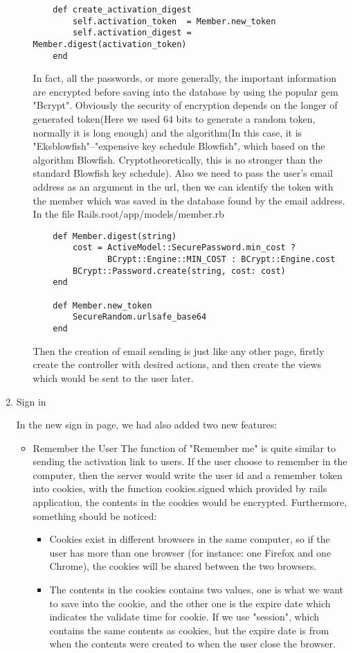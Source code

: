 \begin{enumerate}
\begin{itemize}
\begin{lstlisting}
	def create_activation_digest
		self.activation_token  = Member.new_token
		self.activation_digest = Member.digest(activation_token)
	end
\end{lstlisting}
In fact, all the passwords, or more generally, the important information are encrypted before saving into the database by using the popular gem "Bcrypt". Obviously the security of encryption depends on the longer of generated token(Here we used 64 bits to generate a random token, normally it is long enough) and the algorithm(In this case, it is "Eksblowfish"--"expensive key schedule Blowfish", which based on the algorithm Blowfish. Cryptotheoretically, this is no stronger than the standard Blowfish key schedule). Also we need to pass the user's email address as an argument in the url, then we can identify the token with the member which was saved in the database found by the email address.
In the file Rails.root/app/models/member.rb
\begin{lstlisting}
    def Member.digest(string)
   		cost = ActiveModel::SecurePassword.min_cost ? 
   			   BCrypt::Engine::MIN_COST : BCrypt::Engine.cost
		BCrypt::Password.create(string, cost: cost)
    end
    
    def Member.new_token
   	 	SecureRandom.urlsafe_base64
   	end
\end{lstlisting}
Then the creation of email sending is just like any other page, firstly create the controller with desired actions, and then create the views which would be sent to the user later.
\end{itemize}

\item{Sign in}

In the new sign in page, we had also added two new features:
\begin{itemize}
\item{Remember the User}
The function of "Remember me" is quite similar to sending the activation link to users. If the user choose to remember in the computer, then the server would write the user id and a remember token into cookies, with the function cookies.signed which provided by rails application, the contents in the cookies would be encrypted. Furthermore, something should be noticed: 
\begin{itemize}
\item Cookies exist in different browsers in the same computer, so if the user has more than one browser (for instance: one Firefox and one Chrome), the cookies will be shared between the two browsers. 
\item The contents in the cookies contains two values, one is what we want to save into the cookie, and the other one is the expire date which indicates the validate time for cookie. If we use "session", which contains the same contents as cookies, but the expire date is from when the contents were created to when the user close the browser.
\end{itemize} 


\end{itemize}
\end{enumerate}

